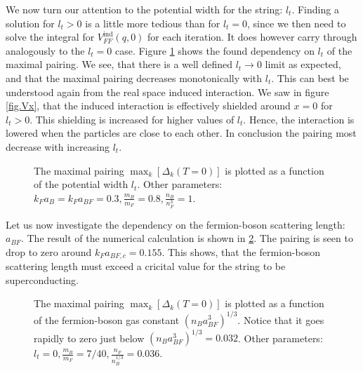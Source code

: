  We now turn our attention to the potential width for the string: $l_t$. Finding a solution for $l_t > 0$ is a little more tedious than for $l_t = 0$, since we then need to solve the integral for $V_{FF}^\text{ind}(q,0)$ for each iteration. It does however carry through analogously to the $l_t = 0$ case. Figure \ref{fig.maxkDeltakltdepend} shows the found dependency on $l_t$ of the maximal pairing. We see, that there is a well defined $l_t \to 0$ limit as expected, and that the maximal pairing decreases monotonically with $l_t$. This can best be understood again from the real space induced interaction. We saw in figure \ref{fig.Vx}, that the induced interaction is effectively shielded around $x = 0$ for $l_t > 0$. This shielding is increased for higher values of $l_t$. Hence, the interaction is lowered when the particles are close to each other. In conclusion the pairing most decrease with increasing $l_t$. 

\begin{figure} 
\begin{center}  
  
\caption{The maximal pairing $\max_k[\Delta_k(T=0)]$ is plotted as a function of the potential width $l_t$. Other parameters: $k_Fa_B = k_F a_{BF} = 0.3, \frac{m_B}{m_F} = 0.8, \frac{n_B}{n_F^3} = 1$.}  
\label{fig.maxkDeltakltdepend}  
\end{center}    
\end{figure}

Let us now investigate the dependency on the fermion-boson scattering length: $a_{BF}$. The result of the numerical calculation is shown in \ref{fig.maxkDeltakaBFdepend}. The pairing is seen to drop to zero around $k_Fa_{BF,c} = 0.155$. This shows, that the fermion-boson scattering length must exceed a cricital value for the string to be superconducting.   

\begin{figure} 
\begin{center}  
  
\caption{The maximal pairing $\max_k[\Delta_k(T=0)]$ is plotted as a function of the fermion-boson gas constant $(n_Ba_{BF}^3)^{1/3}$. Notice that it goes rapidly to zero just below $(n_Ba_{BF}^3)^{1/3}= 0.032$. Other parameters: $l_t = 0, \frac{m_B}{m_F} = 7/40, \frac{n_F}{n_B^{1/3}} = 0.036$.}  
\label{fig.maxkDeltakaBFdepend}  
\end{center}    
\end{figure}

